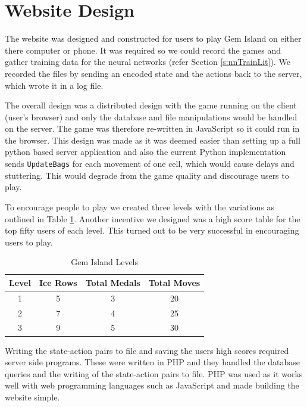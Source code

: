 \documentclass{bhamthesis}
\theoremstyle{definition}
\begin{document}
\section{Website Design}\label{s:website}

The website was designed and constructed for users to play Gem Island on either there computer or phone. It was required so we could record the games and gather training data for the neural networks (refer Section \ref{s:nnTrainLit}). We recorded the files by sending an encoded state and the actions back to the server, which wrote it in a log file.

The overall design was a distributed design with the game running on the client (user's browser) and only the database and file manipulations would be handled on the server. The game was therefore re-written in JavaScript so it could run in the browser. This design was made as it was deemed easier than setting up a full python based server application and also the current Python implementation sends \verb|UpdateBags| for each movement of one cell, which would cause delays and stuttering. This would degrade from the game quality and discourage users to play.

To encourage people to play we created three levels with the variations as outlined in Table \ref{t:gameLevels}. Another incentive we designed was a high score table for the top fifty users of each level. This turned out to be very successful in encouraging users to play.

\begin{table}[]
	\centering
	\caption{Gem Island Levels}
	\label{t:gameLevels}
	\begin{tabular}{cccc}
		\hline
		Level & Ice Rows & Total Medals & Total Moves \\ \hline
		1     & 5        & 3            & 20          \\
		2     & 7        & 4            & 25          \\
		3     & 9        & 5            & 30         
	\end{tabular}
\end{table}



Writing the state-action pairs to file and saving the users high scores required server side programs. These were written in PHP and they handled the database queries and the writing of the state-action pairs to file. PHP was used as it works well with web programming languages such as JavaScript and made building the website simple.
\end{document}
